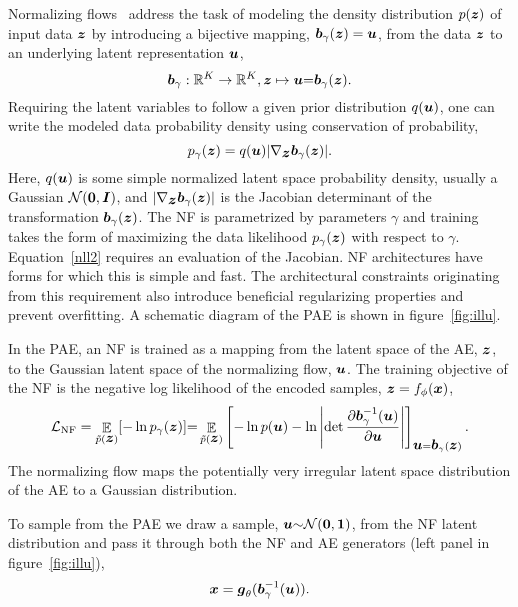 \documentclass[10pt]{article} \usepackage[accepted]{tmlr}
\DeclareMathOperator{\EE}{\mathbb{E}}
\def\bi#1{\hbox{\boldmath{$#1$}}}
\begin{document}
Normalizing flows~\citep{RippelAdams13,DinhKB14,DinhSB16,glow,ffjord18} address the task of modeling the density distribution $p(\bi z)$ of input data $\bi z$ by introducing a bijective mapping, $\bi{b}_{\gamma}(\bi{z})= \bi{u}$, from the data $\bi{z}$ 
to an underlying latent representation $\bi u$,
\begin{equation}
\label{nf}
\bi{b}_\gamma: \mathbb{R}^K \to \mathbb{R}^K, \bi{z} \mapsto \bi{u}{=}\bi b_{\gamma}(\bi z).
\end{equation}
Requiring the latent variables to follow a given prior distribution $q(\bi{u})$, one can write the modeled data 
probability density using 
conservation of probability,
\begin{equation}
p_{\gamma}(\bi z) =q(\bi u)|\nabla_{\bi{z}}\bi{b}_{\gamma}(\bi{z})|.
\label{nll2}
\end{equation}
Here, $q(\bi u)$ is some simple normalized latent space 
probability density, usually a Gaussian $\mathcal{N}(\bi{0},\bi{I})$,  and $|\nabla_{\bi{z}}\bi{b}_{\gamma}(\bi{z})|$ is the Jacobian determinant of the transformation $\bi{b}_{\gamma}(\bi{z})$.  The NF is parametrized by parameters $\gamma$ and training takes the form of 
maximizing the data likelihood $p_{\gamma}(\bi z)$
with respect to $\gamma$. Equation~\ref{nll2} requires an evaluation of the Jacobian. NF architectures have forms for which this is simple and fast. The architectural constraints originating from this requirement also introduce beneficial regularizing properties and prevent overfitting. A schematic diagram of the PAE is shown in figure~\ref{fig:illu}.

In the PAE, an NF is trained as a mapping from the latent space of the AE, $\bi z$, to the Gaussian latent space of the normalizing flow, $\bi u$.
The training objective of the NF is the negative log likelihood of the encoded samples, $\bi{z}=f_\phi(\bi{x})$,
\begin{equation}
\mathcal{L}_{\mathrm{NF}}=  \EE_{\tilde{p}({\bi{z}})}[-\ln p_\gamma(\bi z)]{=} \EE_{\tilde{p}({\bi{z}})}\left[-\ln p(\bi u)- 
\ln \left|\det \frac{\partial \bi{b}^{-1}_{\gamma}(\bi{u})}{\partial \bi u}\right| \right]_{\bi u = \bi b_\gamma(\bi z)}.
\label{loss_NF}
\end{equation}
The normalizing flow maps the potentially very irregular latent space distribution of the AE to a Gaussian distribution. 

To sample from the PAE we draw a sample, $\bi{u}{\sim} \mathcal{N}(\bi 0, \bi{1})$, from the NF latent distribution and pass it through both the NF and AE generators (left panel in figure~\ref{fig:illu}), 
\begin{equation}
    \bi{x}=\bi{g}_\theta(\bi b_{\gamma}^{-1}(\bi u)).
\end{equation}
\end{document}
